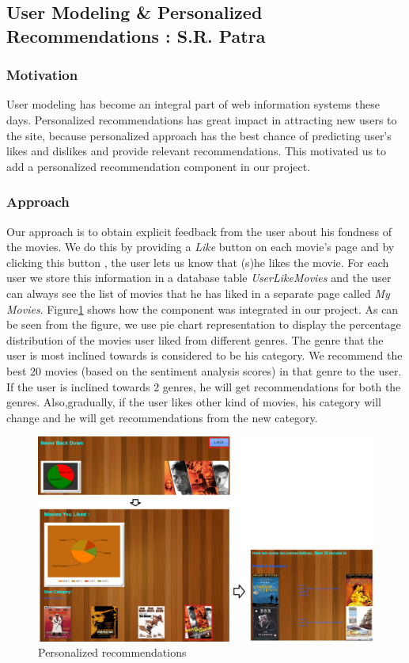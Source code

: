  \subsection{User Modeling \& Personalized Recommendations : S.R. Patra}    
 \subsubsection{Motivation}
 User modeling has become an integral part of web information systems these days. Personalized recommendations has  great impact in attracting new users to the site, because personalized approach has the best chance of predicting user's likes and dislikes and provide relevant recommendations. This motivated us to add a personalized recommendation component in our project.
 
  \subsubsection{Approach}
  Our approach is to obtain explicit feedback from the user about his fondness of the movies. We do this by providing a \textit{Like} button on each movie's page and by clicking this button , the user lets us know that (s)he likes the movie. For each user we store this information in a database table \textit{UserLikeMovies} and the user can always see the list of movies that he has liked in a separate page called \textit{My Movies}. Figure\ref{fig:like} shows how the component was integrated in our project. As can be seen from the figure, we use pie chart representation to display the percentage distribution of the movies user liked from different genres. The genre that the user is most inclined towards is considered to be his category. We recommend the best 20 movies (based on the sentiment analysis scores) in that genre to the user. If the user is inclined towards 2 genres, he will get recommendations for both the genres. Also,gradually, if the user likes other kind of movies, his category will change and he will get recommendations from the new category.
  
  \begin{figure}[H]
    \centering
    \includegraphics[width=5in]{like.png}
    \caption{Personalized recommendations}
    \label{fig:like}
    \end{figure} 
    
